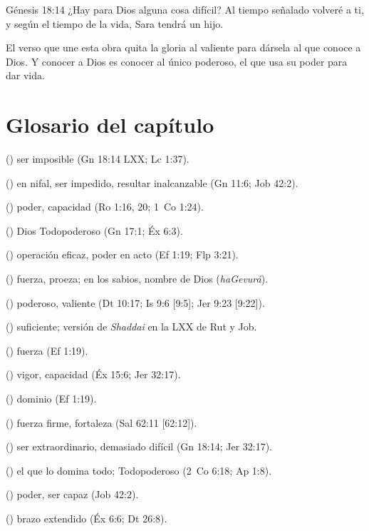 \begin{verso}{Génesis 18:14}
¿Hay para Dios alguna cosa difícil? Al tiempo señalado volveré a ti, y según el tiempo de la vida, Sara tendrá un hijo.
\end{verso}

El verso que une esta obra quita la gloria al valiente para dársela al que conoce a Dios. Y conocer a Dios es conocer al único poderoso, el que usa su poder para dar vida.

\section*{Glosario del capítulo}

\begin{description}\setlength{\itemsep}{2pt}
\item[\emph{Adynatéō}] () ser imposible (Gn 18:14 LXX; Lc 1:37).
\item[\emph{Batsar}] () en nifal, ser impedido, resultar inalcanzable (Gn 11:6; Job 42:2).
\item[\emph{Dýnamis}] () poder, capacidad (Ro 1:16, 20; 1~Co 1:24).
\item[\emph{El Shaddai}] () Dios Todopoderoso (Gn 17:1; Éx 6:3).
\item[\emph{Enérgeia}] () operación eficaz, poder en acto (Ef 1:19; Flp 3:21).
\item[\emph{Gevurá}] () fuerza, proeza; en los sabios, nombre de Dios (\emph{haGevurá}).
\item[\emph{Gibbor}] () poderoso, valiente (Dt 10:17; Is 9:6 [9:5]; Jer 9:23 [9:22]).
\item[\emph{Hikanós}] () suficiente; versión de \emph{Shaddai} en la LXX de Rut y Job.
\item[\emph{Ischýs}] () fuerza (Ef 1:19).
\item[\emph{Kóaj}] () vigor, capacidad (Éx 15:6; Jer 32:17).
\item[\emph{Krátos}] () dominio (Ef 1:19).
\item[\emph{Oz}] () fuerza firme, fortaleza (Sal 62:11 [62:12]).
\item[\emph{Palá}] () ser extraordinario, demasiado difícil (Gn 18:14; Jer 32:17).
\item[\emph{Pantokrátōr}] () el que lo domina todo; Todopoderoso (2~Co 6:18; Ap 1:8).
\item[\emph{Yajol}] () poder, ser capaz (Job 42:2).
\item[\emph{Zeróa netuyá}] () brazo extendido (Éx 6:6; Dt 26:8).
\end{description}

